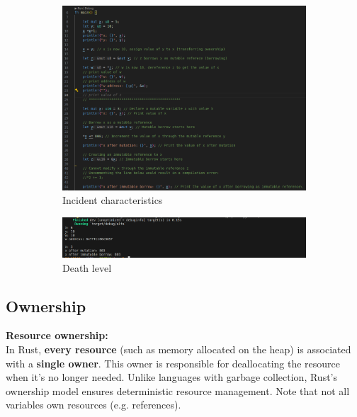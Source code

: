 \documentclass{article}
\begin{document}
\begin{figure}[h!]
    \centering
    \begin{subfigure}{0.70\linewidth}
        \includegraphics[width=\linewidth]{images/code1.png}
        \caption{Incident characteristics}
        \label{fig:code1}
    \end{subfigure}%
    \begin{subfigure}{0.45\linewidth}
        \includegraphics[width=\linewidth]{images/output1.png}
        \caption{Death level}
        \label{fig:output1}
    \end{subfigure}
    \caption{}
    \label{fig:borrowing_mutable_unmutable_manner}
\end{figure}

\subsection{Ownership}
\textbf{Resource ownership:} \\
In Rust, \textbf{every resource} (such as memory allocated on the heap) is associated with a \textbf{single owner}. This owner is responsible for deallocating the resource when it's no longer needed. Unlike languages with garbage collection, Rust's ownership model ensures deterministic resource management. Note that not all variables own resources (e.g. references).
\end{document}
